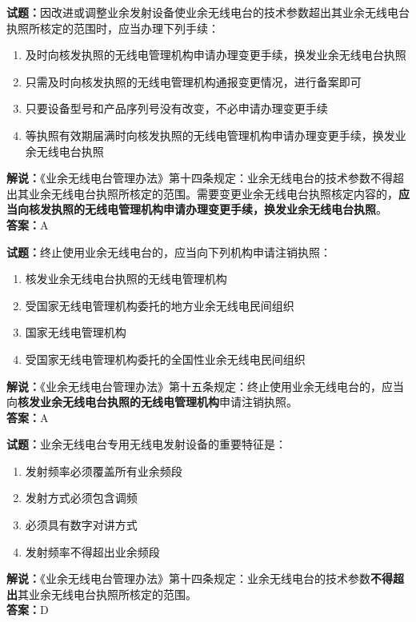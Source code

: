 \documentclass{ctexbook}
\begin{document}
\noindent\textbf{试题：}因改进或调整业余发射设备使业余无线电台的技术参数超出其业余无线电台执照所核定的范围时，应当办理下列手续：
\begin{enumerate}[leftmargin=3em]
  \item 及时向核发执照的无线电管理机构申请办理变更手续，换发业余无线电台执照
  \item 只需及时向核发执照的无线电管理机构通报变更情况，进行备案即可
  \item 只要设备型号和产品序列号没有改变，不必申请办理变更手续
  \item 等执照有效期届满时向核发执照的无线电管理机构申请办理变更手续，换发业余无线电台执照
\end{enumerate}
\noindent\textbf{解说：}《业余无线电台管理办法》第十四条规定：业余无线电台的技术参数不得超出其业余无线电台执照所核定的范围。需要变更业余无线电台执照核定内容的，\textbf{应当向核发执照的无线电管理机构申请办理变更手续，换发业余无线电台执照}。\\\noindent\textbf{答案：}A

\vspace{\baselineskip}

\noindent\textbf{试题：}终止使用业余无线电台的，应当向下列机构申请注销执照：
\begin{enumerate}[leftmargin=3em]
  \item 核发业余无线电台执照的无线电管理机构
  \item 受国家无线电管理机构委托的地方业余无线电民间组织
  \item 国家无线电管理机构
  \item 受国家无线电管理机构委托的全国性业余无线电民间组织
\end{enumerate}
\noindent\textbf{解说：}《业余无线电台管理办法》第十五条规定：终止使用业余无线电台的，应当向\textbf{核发业余无线电台执照的无线电管理机构}申请注销执照。\\\noindent\textbf{答案：}A

\vspace{\baselineskip}

\noindent\textbf{试题：}业余无线电台专用无线电发射设备的重要特征是：
\begin{enumerate}[leftmargin=3em]
  \item 发射频率必须覆盖所有业余频段
  \item 发射方式必须包含调频
  \item 必须具有数字对讲方式
  \item 发射频率不得超出业余频段
\end{enumerate}
\noindent\textbf{解说：}《业余无线电台管理办法》第十四条规定：业余无线电台的技术参数\textbf{不得超出}其业余无线电台执照所核定的范围。\\\noindent\textbf{答案：}D
\end{document}

